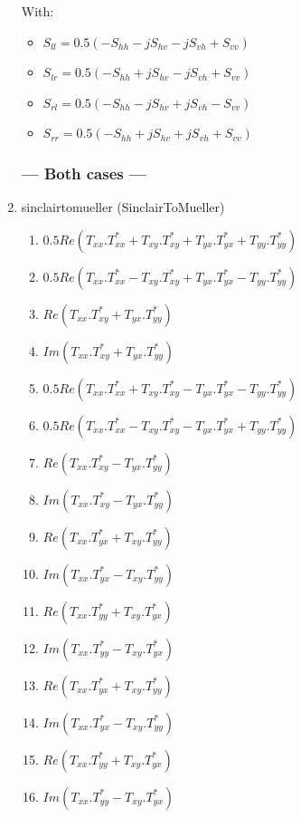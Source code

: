 \begin{enumerate}
With:
\begin{itemize} 
\item $ S_{ll} = 0.5(-S_{hh}-j S_{hv}-j S_{vh}+S_{vv}) $ 
\item $ S_{lr} = 0.5(-S_{hh}+j S_{hv}-j S_{vh}+S_{vv}) $ 
\item $ S_{rl} = 0.5(-S_{hh}-j S_{hv}+j S_{vh}-S_{vv}) $ 
\item $ S_{rr} = 0.5(-S_{hh}+j S_{hv}+j S_{vh}+S_{vv}) $ 
\end{itemize}
 


\subsubsection{--- Both cases ---}

\item sinclairtomueller (SinclairToMueller)
\begin{enumerate} 
\item $ 0.5 Re( T_{xx}.T_{xx}^{*} + T_{xy}.T_{xy}^{*} + T_{yx}.T_{yx}^{*} + T_{yy}.T_{yy}^{*} ) $ 
\item $ 0.5 Re( T_{xx}.T_{xx}^{*} - T_{xy}.T_{xy}^{*} + T_{yx}.T_{yx}^{*} - T_{yy}.T_{yy}^{*} ) $ 
\item $ Re( T_{xx}.T_{xy}^{*} + T_{yx}.T_{yy}^{*} ) $ 
\item $ Im( T_{xx}.T_{xy}^{*} + T_{yx}.T_{yy}^{*} ) $ 
\item $ 0.5 Re( T_{xx}.T_{xx}^{*} + T_{xy}.T_{xy}^{*} - T_{yx}.T_{yx}^{*} - T_{yy}.T_{yy}^{*} ) $ 
\item $ 0.5 Re( T_{xx}.T_{xx}^{*} - T_{xy}.T_{xy}^{*} - T_{yx}.T_{yx}^{*} + T_{yy}.T_{yy}^{*} ) $ 
\item $ Re( T_{xx}.T_{xy}^{*} - T_{yx}.T_{yy}^{*} ) $ 
\item $ Im( T_{xx}.T_{xy}^{*} - T_{yx}.T_{yy}^{*} ) $ 
\item $ Re( T_{xx}.T_{yx}^{*} + T_{xy}.T_{yy}^{*} ) $ 
\item $ Im( T_{xx}.T_{yx}^{*} - T_{xy}.T_{yy}^{*} ) $ 
\item $ Re( T_{xx}.T_{yy}^{*} + T_{xy}.T_{yx}^{*} ) $ 
\item $ Im( T_{xx}.T_{yy}^{*} - T_{xy}.T_{yx}^{*} ) $ 
\item $ Re( T_{xx}.T_{yx}^{*} + T_{xy}.T_{yy}^{*} ) $ 
\item $ Im( T_{xx}.T_{yx}^{*} - T_{xy}.T_{yy}^{*} ) $ 
\item $ Re( T_{xx}.T_{yy}^{*} + T_{xy}.T_{yx}^{*} ) $ 
\item $ Im( T_{xx}.T_{yy}^{*} - T_{xy}.T_{yx}^{*} ) $
\end{enumerate}


\end{enumerate}
